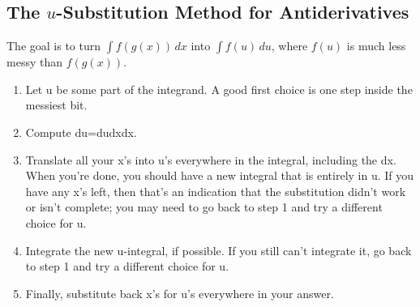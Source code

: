 \subsection{The $u$-Substitution Method for Antiderivatives}
The goal is to turn $\int f(g(x))\,dx$ into $\int f(u)\,du$, where $f(u)$ is much less messy than $f(g(x))$.
\begin{enumerate}
  \item Let u be some part of the integrand. A good first choice is one step inside the messiest bit.
  \item Compute du=dudxdx.
  \item Translate all your x's into u's everywhere in the integral, including the dx. When you're done, you should have a new integral that is entirely in u. If you have any x's left, then that's an indication that the substitution didn't work or isn't complete; you may need to go back to step 1 and try a different choice for u.
  \item Integrate the new u-integral, if possible. If you still can't integrate it, go back to step 1 and try a different choice for u.
  \item Finally, substitute back x's for u's everywhere in your answer.
\end{enumerate}
